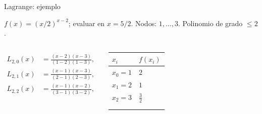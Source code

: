 \documentclass[main.tex]{subfiles}
\begin{document}
\begin{frame}[t]{Lagrange: ejemplo}
\par\noindent\begin{minipage}[t][7.5mm][t]{\textwidth}\small\strut $f(x)=(x/2)^{x-2}$; evaluar en $x=5/2$. Nodos: $1,\ldots,3$. Polinomio de grado $\le 2$.\end{minipage}\par\nointerlineskip
\begin{columns}[T]\small\setlength{\abovedisplayskip}{4pt}\setlength{\belowdisplayskip}{4pt}\scriptsize\begin{align*}L_{2,0}(x)&=\frac{(x-2)(x-3)}{(1-2)(1-3)},\\L_{2,1}(x)&=\frac{(x-1)(x-3)}{(2-1)(2-3)},\\L_{2,2}(x)&=\frac{(x-1)(x-2)}{(3-1)(3-2)},\\\end{align*}\begingroup\small\setlength{\tabcolsep}{3pt}\begin{center}\begin{tabular}{|C{.42\textwidth}|C{.42\textwidth}|}\hline
\rule[-2mm]{0pt}{6mm}$x_i$&$f(x_i)$\\\hline
\rule[-2.5mm]{0pt}{6mm}$x_0=1$&$2$\\\hline
\rule[-2.5mm]{0pt}{6mm}$x_1=2$&$1$\\\hline
\rule[-2.5mm]{0pt}{6mm}$x_2=3$&$\frac{3}{2}$\\\hline
\rule[-2.5mm]{0pt}{6mm}&\\\hline
\rule[-2.5mm]{0pt}{6mm}&\\\hline
\end{tabular}\end{center}\endgroup\par
\end{columns}
\end{frame}
\end{document}
